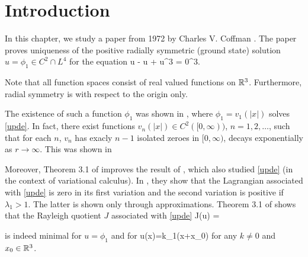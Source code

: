 \section{Introduction}

In this chapter, we study a paper from 1972 by Charles V. Coffman \cite{coffm}. 
The paper proves uniqueness of the positive radially symmetric (ground
state) solution $u=\phi_1\in C^2\cap L^4$ for the equation
\be\label{upde}
\Delta u - u + u^3 = 0\quad{}\R^3.
\ee

Note that all function spaces consist of real valued functions on $\mathbb{R}^3$.
Furthermore, radial symmetry is with respect to the origin only. 

The existence of such a function $\phi_1$ was shown in \cite{nehari},
where $\phi_1=v_1(|x|)$ solves \eqref{upde}. In fact, there exist functions
$v_n(|x|)\in C^2([0, \infty))$, $n=1, 2, \ldots$, such that for each $n$, $v_n$
has exacly $n-1$ isolated zeroes in $[0, \infty)$, decays exponentially as
$r\to\infty$. This was shown in \cite{ryder, berger}

Moreover, Theorem 3.1 of \cite{coffm} improves the result of \cite{robinson}, 
which also studied \eqref{upde} (in the context of variational calculus). 
In \cite{robinson}, they show that the Lagrangian associated with \eqref{upde}
is zero in its first variation and the second variation is positive if
$\lambda_1 > 1$. The latter is shown only through approximations. Theorem 3.1 of
\cite{coffm} shows that the Rayleigh quotient $J$ associated with \eqref{upde}
\be\label{rayleigh} 
J(u) = 
\ee

is indeed minimal for $u=\phi_1$ and for 
\be\label{uts}
u(x)=k\phi_1(x+x_0)
\ee
for any $k\neq 0$ and
$x_0\in \mathbb{R}^3$.
